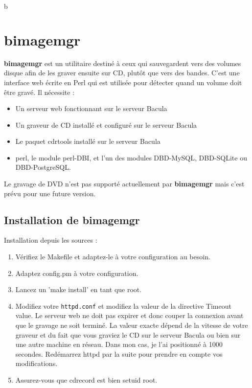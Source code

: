 b%

\section{bimagemgr}
\label{bimagemgr}

{\bf bimagemgr} est un utilitaire destiné à ceux qui sauvegardent vers des 
volumes disque afin de les graver ensuite sur CD, plutôt que vers des bandes.
C'est une interface web écrite en Perl qui est utilisée pour détecter quand un
volume doit être gravé. Il nécessite : 

\begin{itemize}
\item Un serveur web fonctionnant sur le serveur Bacula 
\item Un graveur de CD installé et configuré sur le serveur Bacula 
\item Le paquet cdrtools installé sur le serveur Bacula 
\item perl, le module perl-DBI, et l'un des modules DBD-MySQL, DBD-SQLite ou
DBD-PostgreSQL. 
\end{itemize}

Le gravage de DVD n'est pas supporté actuellement par {\bf bimagemgr} mais c'est
prévu pour une future version. 

\subsection{Installation de bimagemgr}


Installation depuis les sources :
\begin{enumerate}
\item Vérifiez le Makefile et adaptez-le à votre configuration au besoin.
\item Adaptez config.pm à votre configuration.
\item Lancez un 'make install' en tant que root.
\item Modifiez votre \texttt{httpd.conf} et modifiez la valeur de la directive
    Timeout value. Le serveur web ne doit pas expirer et donc couper la 
    connexion avant que le gravage ne soit terminé. La valeur exacte dépend de
    la vitesse de votre graveur et du fait que vous graviez le CD sur le serveur
    Bacula ou bien sur une autre machine en réseau. Dans mon cas, je l'ai 
    positionné à 1000 secondes. Redémarrez httpd par la suite pour prendre en
    compte vos modifications.
\item Assurez-vous que cdrecord est bien setuid root.
\end{enumerate}

